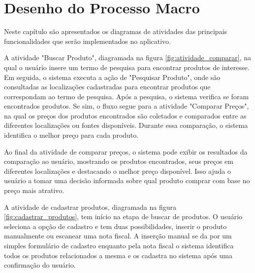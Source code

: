 \chapter{Desenho do Processo Macro} \label{cha:desenhomacro}
Neste capítulo são apresentados os diagramas de atividades das principais funcionalidades que serão implementados no aplicativo.


A atividade "Buscar Produto", diagramada na figura \autoref{fig:atividade_comparar}, na qual o usuário insere um termo de pesquisa para encontrar produtos de interesse. Em seguida, o sistema executa a ação de "Pesquisar Produto", onde são consultadas as localizações cadastradas para encontrar produtos que correspondam ao termo de pesquisa. Após a pesquisa, o sistema verifica se foram encontrados produtos. Se sim, o fluxo segue para a atividade "Comparar Preços", na qual os preços dos produtos encontrados são coletados e comparados entre as diferentes localizações ou fontes disponíveis. Durante essa comparação, o sistema identifica o melhor preço para cada produto.

Ao final da atividade de comparar preços, o sistema pode exibir os resultados da comparação ao usuário, mostrando os produtos encontrados, seus preços em diferentes localizações e destacando o melhor preço disponível. Isso ajuda o usuário a tomar uma decisão informada sobre qual produto comprar com base no preço mais atrativo.

A atividade de cadastrar produtos, diagramada na figura \autoref{fig:cadastrar_produtos}, tem início na etapa de buscar de produtos. O usuário seleciona a opção de cadastro e tem duas possibilidades, inserir o produto manualmente ou escanear uma nota fiscal. A inserção manual se da por um simples formulário de cadastro enquanto pela nota fiscal o sistema identifica todos os produtos relacionados a mesma e os cadastra no sistema após uma confirmação do usuário.

